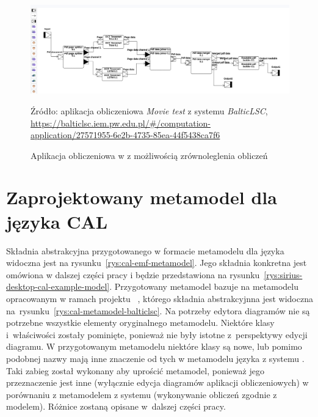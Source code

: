 \begin{figure}[!ht]
	\centering

	\includegraphics[width=0.99\linewidth]{./images/balticlsc-concurrent-application-example.png}
	\caption{Aplikacja obliczeniowa w \BalticLSC{} z możliwością
		zrównoleglenia obliczeń}\label{rys:mozliwa-do-zrownoleglenia-aplikacja-obliczeniowa}
  \medskip
  {\small Źródło: aplikacja obliczeniowa \emph{Movie test}
    z systemu \emph{BalticLSC},\\
    \url{https://balticlsc.iem.pw.edu.pl/#/computation-application/27571955-6e2b-4735-85ea-44f5438ca7f6}}
\end{figure}

\section{Zaprojektowany metamodel dla języka CAL}

Składnia abstrakcyjna przygotowanego w formacie \Ecore{} metamodelu dla języka
\CAL{} widoczna jest na
rysunku~\ref{rys:cal-emf-metamodel}. Jego składnia konkretna
jest omówiona w dalszej części pracy i będzie przedstawiona na
rysunku~\ref{rys:sirius-desktop-cal-example-model}.
Przygotowany metamodel bazuje na metamodelu
opracowanym w ramach projektu \BalticLSC{}~\cite{cal-metamodel}, którego
składnia abstrakcyjnna jest widoczna
na~rysunku~\ref{rys:cal-metamodel-balticlsc}.
Na potrzeby edytora diagramów nie są potrzebne wszystkie elementy oryginalnego
metamodelu. Niektóre klasy i~właściwości zostały pominięte, ponieważ nie były
istotne z~perspektywy edycji diagramu.
W przygotowanym metamodelu niektóre klasy są nowe, lub pomimo podobnej nazwy
mają inne znaczenie od tych w metamodelu języka \CAL{} z systemu \BalticLSC{}.
Taki zabieg został wykonany aby uprościć metamodel, ponieważ jego przeznaczenie
jest inne (wyłącznie edycja diagramów aplikacji obliczeniowych) w porównaniu z
metamodelem z systemu \BalticLSC{} (wykonywanie obliczeń zgodnie z modelem).
Różnice zostaną opisane w~dalszej części pracy.

